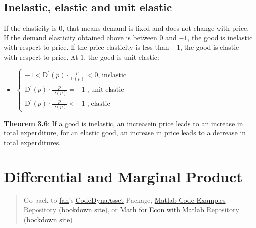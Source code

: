 \documentclass[
]{book}
\providecommand{\tightlist}{%
  \setlength{\itemsep}{0pt}\setlength{\parskip}{0pt}}
\begin{document}
\hypertarget{inelastic-elastic-and-unit-elastic}{%
\subsection{\texorpdfstring{\textbf{Inelastic, elastic and unit elastic}}{Inelastic, elastic and unit elastic}}\label{inelastic-elastic-and-unit-elastic}}

If the elasticity is \(0\), that means demand is fixed and does not change
with price. If the demand elasticity obtained above is between \(0\) and
\(-1\), the good is inelastic with respect to price. If the price
elasticity is less than \(-1\), the good is elastic with respect to price.
At \(1\), the good is unit elastic:

\begin{itemize}
\tightlist
\item
  \(\displaystyle \left\lbrace \begin{array}{c} -1<{\textrm{D}}^{\prime } (p)\cdot \frac{p}{\textrm{D}(p)}<0\textrm{,}\;\textrm{inelastic}\\ {\textrm{D}}^{\prime } (p)\cdot \frac{p}{\textrm{D}(p)}=-1\;\textrm{,}\;\textrm{unit}\;\textrm{elastic}\\ {\textrm{D}}^{\prime } (p)\cdot \frac{p}{\textrm{D}(p)}<-1\;\textrm{,}\;\textrm{elastic} \end{array}\right.\)
\end{itemize}

\textbf{Theorem 3.6}: If a good is inelastic, an increasein price leads to an
increase in total expenditure, for an elastic good, an increase in price
leads to a decrease in total expenditures.

\hypertarget{differential-and-marginal-product}{%
\section{Differential and Marginal Product}\label{differential-and-marginal-product}}

\begin{quote}
Go back to \href{http://fanwangecon.github.io/}{fan}'s \href{https://fanwangecon.github.io/CodeDynaAsset/}{CodeDynaAsset} Package, \href{https://fanwangecon.github.io/M4Econ/}{Matlab Code Examples} Repository (\href{https://fanwangecon.github.io/M4Econ/bookdown}{bookdown site}), or \href{https://fanwangecon.github.io/Math4Econ/}{Math for Econ with Matlab} Repository (\href{https://fanwangecon.github.io/Math4Econ/bookdown}{bookdown site}).
\end{quote}
\end{document}
